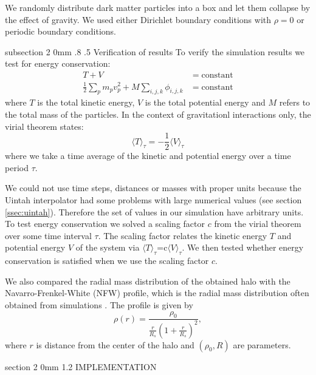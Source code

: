 \documentclass[notitlepage, 12pt]{article}
\makeatletter
\renewcommand{\section}{\@startsection       %
        {section}
        {2}
        {0mm}
        {1.2\baselineskip}
        {\baselineskip}
        {\centering\normalsize}}
\renewcommand{\subsection}{\@startsection    %
        {subsection}
        {2}
        {0mm}
        {.8\baselineskip}
        {.5\baselineskip}
        {\bfseries\normalsize}}
\makeatother
\begin{document}
We randomly distribute dark matter particles into a box and let them collapse by the effect of gravity. We used either Dirichlet boundary conditions with $\rho=0$ or periodic boundary conditions.    

\subsection{Verification of results}
To verify the simulation results we test for energy conservation:
\begin{equation}
\begin{aligned}
T+V&=\mathrm{constant}\\
\frac{1}{2}\sum_{p} m_pv_p^2 + M\sum_{i,j,k}\phi_{i,j,k} &= \mathrm{constant} 
\end{aligned}
\end{equation}
where $T$ is the total kinetic energy, $V$ is the total potential energy and $M$ refers to the total mass of the particles. In the context of gravitationl interactions only, the virial theorem states:
\begin{equation}
\langle T \rangle_\tau = -\frac{1}{2}\langle V \rangle_\tau
\end{equation}
where we take a time average of the kinetic and potential energy over a time period $\tau$.

We could not use time steps, distances or masses with proper units because the Uintah interpolator had some problems with large numerical values (see section \ref{ssec:uintah}). Therefore the set of values in our simulation have arbitrary units. To test energy conservation we solved a scaling factor $c$ from the virial theorem over some time interval $\tau$. The scaling factor relates the kinetic energy $T$ and potential energy $V$ of the system via $\langle T \rangle_{\tau}$=c$\langle V\rangle_{\tau}$. We then tested whether energy conservation is satisfied when we use the scaling factor $c$.  

We also compared the radial mass distribution of the obtained halo with the Navarro-Frenkel-White (NFW) profile, which is the radial mass distribution often obtained from simulations \citep{Navarro1995}. The profile is given by  
\begin{equation}
\rho(r) = \frac{\rho_0}{\frac{r}{R_s}\left(1 + \frac{r}{R_s}\right)^2},
\label{eq:nfw}
\end{equation}
where $r$ is distance from the center of the halo and $(\rho_0,R)$ are parameters.    

\section{IMPLEMENTATION}
\end{document}

